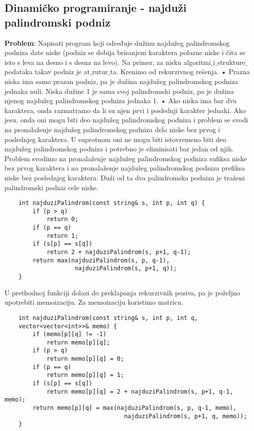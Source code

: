 \documentclass{article}
\begin{document}
\subsection{Dinamičko programiranje - najduži palindromski podniz}
\textbf{Problem}: Napisati program koji određuje dužinu najdužeg palindromskog
podniza date niske (podniz se dobija brisanjem karaktera polazne niske
i čita se isto s leva na desno i s desna na levo). Na primer, za nisku
algoritmi$\_$i$\_$strukture$\_$podataka takav podniz je at$\_$rutur$\_$ta.
\newline
Krenimo od rekurzivnog rešenja.
\newline \hspace*{0.4cm}• Prazna niska ima samo prazan podniz, pa je dužina najdužeg palindromskog
podniza jednaka nuli. Niska dužine 1 je sama svoj palindromski podniz,
pa je dužina njenog najdužeg palindromskog podniza jednaka 1.
\newline \hspace*{0.4cm}• Ako niska ima bar dva karaktera, onda razmatramo da li su njen prvi i
poslednji karakter jednaki. Ako jesu, onda oni mogu biti deo najdužeg
palindromskog podniza i problem se svodi na pronalaženje najdužeg palindromskog podniza dela niske bez prvog i poslednjeg karaktera. U suprotnom oni ne mogu biti istovremeno biti deo najdužeg palindromskog podniza
i potrebno je eliminisati bar jedan od njih. Problem svodimo na
pronalaženje najdužeg palindromskog podniza sufiksa niske bez prvog
karaktera i na pronalaženje najdužeg palindromskog podniza prefiksa niske
bez poslednjeg karaktera. Duži od ta dva palindromska podniza je traženi
palindromski podniz cele niske.
\begin{lstlisting}
    int najduziPalindrom(const string& s, int p, int q) {
        if (p > q)
            return 0;
        if (p == q)
            return 1;
        if (s[p] == s[q])
            return 2 + najduziPalindrom(s, p+1, q-1);
        return max(najduziPalindrom(s, p, q-1),
                    najduziPalindrom(s, p+1, q));
    }
\end{lstlisting}
U prethodnoj funkciji dolazi do preklapanja rekurzivnih poziva, pa je poželjno
upotrebiti memoizaciju. Za memoizaciju koristimo matricu.
\begin{lstlisting}
    int najduziPalindrom(const string& s, int p, int q,
    vector<vector<int>>& memo) {
        if (memo[p][q] != -1)
            return memo[p][q];
        if (p > q)
            return memo[p][q] = 0;
        if (p == q)
            return memo[p][q] = 1;
        if (s[p] == s[q])
            return memo[p][q] = 2 + najduziPalindrom(s, p+1, q-1, memo);
        return memo[p][q] = max(najduziPalindrom(s, p, q-1, memo),
                                  najduziPalindrom(s, p+1, q, memo));
    }
\end{lstlisting}
\end{document}

